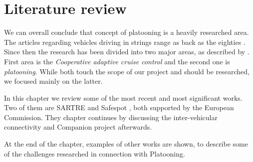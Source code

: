\section{Literature review}\label{sec:literature}
% 
% 
We can overall conclude that concept of platooning is a heavily researched area. The articles regarding vehicles driving in strings range as back as the eighties \cite{Peppard1974StringSystems}.
Since then the research has been divided into two major areas, as described by \cite{Vinel2015Vehicle-to-vehicleScenarios}. First area is the \emph{Cooperative adaptive cruise control} and the second one is \emph{platooning}. While both touch the scope of our project and should be researched, we focused mainly on the latter.\par
% 
In this chapter we review some of the most recent and most significant works. Two of them are SARTRE \cite{Chan2012ProjectSARTRE} and Safespot \cite{Safespot}, both supported by the European Commission. They chapter continues by discussing the inter-vehicular connectivity and Companion \cite{2016CompanionProject} project afterwards.\par
% 
At the end of the chapter, examples of other works are shown, to describe some of the challenges researched in connection with Platooning.














